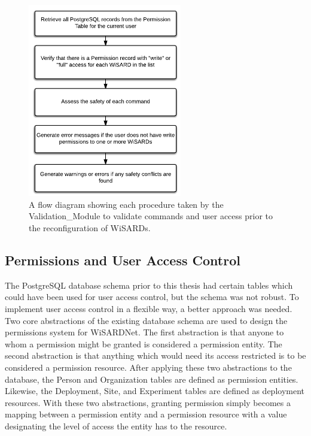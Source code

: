 \begin{figure}[H]
	\centering
	\includegraphics[width=0.6\textwidth]{figures/flow_diagram_validation_module.png}
	\caption{A flow diagram showing each procedure taken by the Validation\_Module to validate commands and user access prior to the reconfiguration of WiSARDs.}
	\label{fig:flow_validation_module}
\end{figure}

\subsection{Permissions and User Access Control}
The PostgreSQL database schema prior to this thesis had certain tables which could have been used for user access control, but the schema was not robust. To implement user access control in a flexible way, a better approach was needed. Two core abstractions of the existing database schema are used to design the permissions system for WiSARDNet. The first abstraction is that anyone to whom a permission might be granted is considered a permission entity. The second abstraction is that anything which would need its access restricted is to be considered a permission resource. After applying these two abstractions to the database, the Person and Organization tables are defined as permission entities. Likewise, the Deployment, Site, and Experiment tables are defined as deployment resources. With these two abstractions, granting permission simply becomes a mapping between a permission entity and a permission resource with a value designating the level of access the entity has to the resource.


